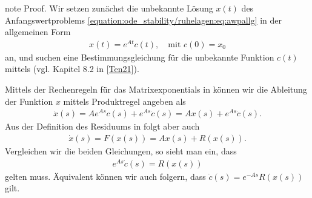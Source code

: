 \documentclass[letterpaper,10pt,english]{jupyterBook}
\begin{document}
\begin{sphinxadmonition}{note}
\sphinxAtStartPar
Proof. Wir setzen zunächst die unbekannte Lösung \(x(t)\) des Anfangswertproblems \eqref{equation:ode_stability/ruhelagen:eq:awpallg} in der allgemeinen Form
\begin{equation*}
\begin{split}x(t) = e^{At}c(t),\quad \text{mit }c(0) = x_0\end{split}
\end{equation*}
\sphinxAtStartPar
an, und suchen eine Bestimmungsgleichung für die unbekannte Funktion \(c(t)\) mittels  (vgl. Kapitel 8.2 in {[}\hyperlink{cite.references:id12}{Ten21}{]}).

\sphinxAtStartPar
Mittels der Rechenregeln für das Matrixexponentials in {\hyperref[\detokenize{ode/repetition:rem:matrixexponential_regeln}]{}} können wir die Ableitung der Funktion \(x\) mittels Produktregel angeben als
\begin{equation*}
\begin{split}\dot{x}(s) = A e^{As}c(s)+ e^{As}\dot{c}(s) = Ax(s) + e^{As}\dot{c}(s).\end{split}
\end{equation*}
\sphinxAtStartPar
Aus der Definition des Residuums in {\hyperref[\detokenize{ode_stability/ruhelagen:def:linearisierung}]{}} folgt aber auch
\begin{equation*}
\begin{split}\dot{x}(s) = F(x(s)) = Ax(s) + R(x(s)).\end{split}
\end{equation*}
\sphinxAtStartPar
Vergleichen wir die beiden Gleichungen, so sieht man ein, dass
\begin{equation*}
\begin{split}e^{As}\dot{c}(s) = R(x(s))\end{split}
\end{equation*}
\sphinxAtStartPar
gelten muss.
Äquivalent können wir auch folgern, dass \(\dot{c}(s) = e^{-As}R(x(s))\) gilt.


\end{sphinxadmonition}
\end{document}
